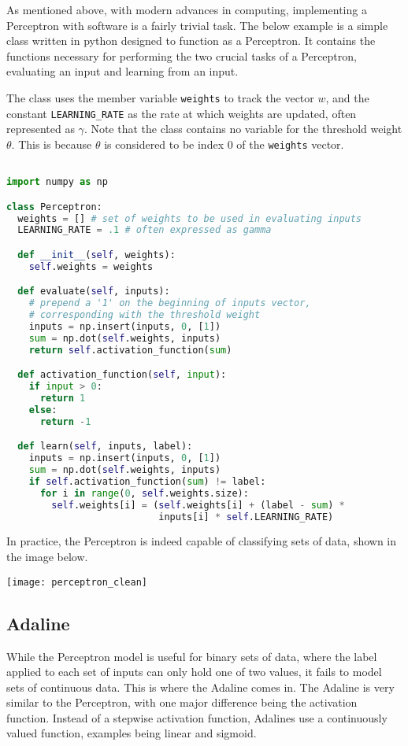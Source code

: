 \documentclass[a4paper, 11pt]{article} %
\begin{document}
As mentioned above, with modern advances in computing, implementing a Perceptron with software is a fairly trivial task.  The below example is a simple class written in python designed to function as a Perceptron.  It contains the functions necessary for performing the two crucial tasks of a Perceptron, evaluating an input and learning from an input.

The class uses the member variable \lstinline|weights| to track the vector $w$, and the constant \lstinline|LEARNING_RATE| as the rate at which weights are updated, often represented as $\gamma$.  Note that the class contains no variable for the threshold weight $\theta$.  This is because $\theta$ is considered to be index 0 of the \lstinline|weights| vector.

\begin{lstlisting}[language = python]

import numpy as np

class Perceptron:
  weights = [] # set of weights to be used in evaluating inputs
  LEARNING_RATE = .1 # often expressed as gamma

  def __init__(self, weights):
    self.weights = weights

  def evaluate(self, inputs):
    # prepend a '1' on the beginning of inputs vector,
    # corresponding with the threshold weight
    inputs = np.insert(inputs, 0, [1]) 
    sum = np.dot(self.weights, inputs)
    return self.activation_function(sum)

  def activation_function(self, input):
    if input > 0:
      return 1
    else:
      return -1

  def learn(self, inputs, label):
    inputs = np.insert(inputs, 0, [1])
    sum = np.dot(self.weights, inputs)
    if self.activation_function(sum) != label:
      for i in range(0, self.weights.size):
        self.weights[i] = (self.weights[i] + (label - sum) *
                           inputs[i] * self.LEARNING_RATE)

\end{lstlisting}

In practice, the Perceptron is indeed capable of classifying sets of data, shown in the image below.

\texttt{[image: perceptron\_clean]}

\subsection*{Adaline}

While the Perceptron model is useful for binary sets of data, where the label applied to each set of inputs can only hold one of two values, it fails to model sets of continuous data.  This is where the Adaline comes in.  The Adaline is very similar to the Perceptron, with one major difference being the activation function.  Instead of a stepwise activation function, Adalines use a continuously valued function, examples being linear and sigmoid.
\end{document}

